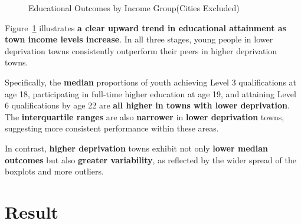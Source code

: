 \documentclass[11pt,en]{../tex/elegantpaper}
\begin{document}
\begin{figure}[H]


\caption{\label{fig-edu_outcomes_boxplot}Educational Outcomes by Income
Group(Cities Excluded)}

\end{figure}%

Figure~\ref{fig-edu_outcomes_boxplot} illustrates \textbf{a clear upward
trend in educational attainment as town income levels increase}. In all
three stages, young people in lower deprivation towns consistently
outperform their peers in higher deprivation towns.

Specifically, the \textbf{median} proportions of youth achieving Level 3
qualifications at age 18, participating in full-time higher education at
age 19, and attaining Level 6 qualifications by age 22 are \textbf{all
higher in towns with lower deprivation}. The \textbf{interquartile
ranges} are also \textbf{narrower} in \textbf{lower deprivation} towns,
suggesting more consistent performance within these areas.

In contrast, \textbf{higher deprivation} towns exhibit not only
\textbf{lower median outcomes} but also \textbf{greater variability}, as
reflected by the wider spread of the boxplots and more outliers.

\section{Result}\label{result}
\end{document}
